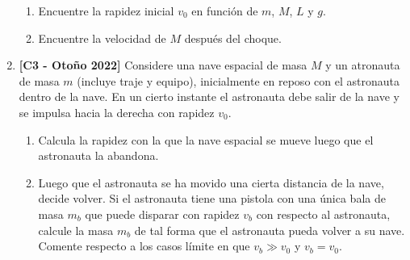 \documentclass[letterpaper,11pt]{article}
\begin{document}
\begin{enumerate}
\begin{enumerate}
    \item Encuentre la rapidez inicial $v_0$ en función de $m$, $M$, $L$ y $g$.
    \item Encuentre la velocidad de $M$ después del choque.
\end{enumerate}

\item \textbf{[C3 - Otoño 2022]} Considere una nave espacial de masa $M$ y un atronauta de masa $m$ (incluye traje y equipo), inicialmente en reposo con el astronauta dentro de la nave. En un cierto instante el astronauta debe salir de la nave y se impulsa hacia la derecha con rapidez $v_0$.

\begin{figure}[htbp]
  \centering
  
\end{figure}

\begin{enumerate}
    \item Calcula la rapidez con la que la nave espacial se mueve luego que el astronauta la abandona.
    \item Luego que el astronauta se ha movido una cierta distancia de la nave, decide volver. Si el astronauta tiene una pistola con una única bala de masa $m_b$ que puede disparar con rapidez $v_b$ con respecto al astronauta, calcule la masa $m_b$ de tal forma que el astronauta pueda volver a su nave. Comente respecto a los casos límite en que $v_b \gg v_0$ y $v_b = v_0$.
\end{enumerate}
    


%   

\end{enumerate}
\end{document}

